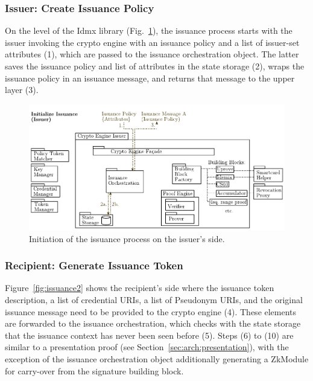 \subsubsection{Issuer: Create Issuance Policy} 

On the level of the Idmx library (Fig.~\ref{fig:issuance1}), the issuance process starts with  the issuer invoking the crypto engine 
with an issuance policy and a list of issuer-set attributes (1), which 
are passed to the issuance orchestration object.
The latter saves the issuance policy and list of attributes in the state storage (2),
wraps the issuance policy in an issuance message, and returns that message to the upper layer (3).

\begin{figure}[htbp]
\includegraphics[width=\textwidth]{img/12.pdf}
\caption{Initiation of the issuance process on the issuer's side.}
\label{fig:issuance1}
\end{figure}




\subsubsection{Recipient: Generate Issuance Token} 

Figure~\ref{fig:issuance2} shows the recipient's side where the issuance token description, 
a list of credential URIs, a list of Pseudonym URIs, 
and the original issuance message need to be provided to the crypto engine (4).
%
These elements are forwarded to the issuance orchestration, which checks with the state storage that
the issuance context has never been seen before (5). 
Steps (6) to (10) are similar to a presentation proof (see Section~\ref{sec:arch:presentation}), with the exception of the 
issuance orchestration object additionally generating a ZkModule for carry-over from the signature building block.

